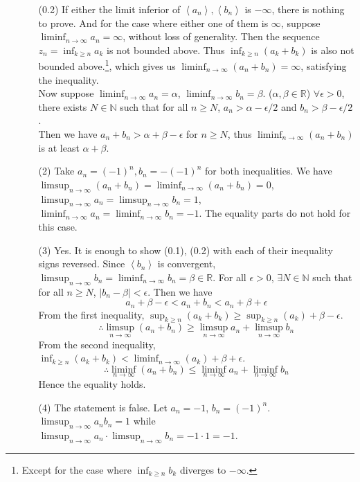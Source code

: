 \documentclass[12pt]{report}
\newcommand{\bb}[1]{\mathbb{#1}}
\renewcommand{\span}[1]{\left\langle #1 \right\rangle}
\newcommand{\abs}[1]{\left|#1\right|}
\newcommand{\ds}{\displaystyle}
\begin{document}
\begin{enumerate}
\begin{enumerate}
	(0.2) If either the limit inferior of $\span{a_n}, \span{b_n}$ is $-\infty$, there is nothing to prove. And for the case where either one of them is $\infty$, suppose $\ds\liminf_{n\rightarrow \infty}a_n=\infty$, without loss of generality. Then the sequence $z_n=\inf_{k\geq n}a_k$ is not bounded above. Thus $\inf_{k\geq n}(a_k+b_k)$ is also not bounded above.\footnote{Except for the case where $\inf_{k\geq n}b_k$ diverges to $-\infty$.}, which gives us $\ds \liminf_{n\rightarrow \infty}(a_n+b_n) = \infty$, satisfying the inequality.\\
	Now suppose $\ds\liminf_{n\rightarrow \infty}a_n = \alpha$, $\ds \liminf_{n\rightarrow \infty} b_n = \beta$. ($\alpha, \beta \in \bb{R}$) $\forall \epsilon > 0$, there exists $N\in \bb{N}$ such that for all $n\geq N$, $a_n > \alpha - \epsilon/2$ and $b_n > \beta - \epsilon /2$. \\Then we have $a_n+b_n > \alpha + \beta - \epsilon$ for $n\geq N$, thus $\ds\liminf_{n\rightarrow \infty}(a_n+b_n)$ is at least $\alpha+\beta$.
	\item[(2)] Take $a_n = (-1)^n, b_n = -(-1)^n$ for both inequalities. We have $\ds\limsup_{n\rightarrow \infty}(a_n+b_n) = \liminf_{n\rightarrow \infty}(a_n+b_n)= 0$, $\ds \limsup_{n\rightarrow \infty}a_n = \limsup_{n\rightarrow \infty}b_n = 1$, $\ds \liminf_{n\rightarrow \infty}a_n = \liminf_{n\rightarrow \infty}b_n=-1$. The equality parts do not hold for this case.
	\item[(3)] Yes. It is enough to show (0.1), (0.2) with each of their inequality signs reversed. Since $\span{b_n}$ is convergent, $\limsup_{n\rightarrow \infty} b_n = \liminf_{n\rightarrow \infty} b_n = \beta \in \bb{R}$. For all $ \epsilon > 0 $, $\exists N\in\bb{N}$ such that for all $n\geq N$, $\abs{b_n-\beta} < \epsilon$. Then we have $$a_n+\beta-\epsilon < a_n+b_n < a_n+\beta+\epsilon$$From the first inequality, $\sup_{k\geq n}(a_k+b_k) \geq \sup_{k\geq n}(a_k) + \beta-\epsilon$. $$\therefore \limsup_{n\rightarrow \infty}(a_n+b_n)\geq \limsup_{n\rightarrow \infty}a_n + \limsup_{n\rightarrow \infty}b_n$$ 
	From the second inequality, $\inf_{k\geq n}(a_k+b_k) < \liminf_{n\rightarrow \infty}(a_k) + \beta+\epsilon$.
	$$\therefore \liminf_{n\rightarrow \infty}(a_n+b_n)\leq \liminf_{n\rightarrow \infty}a_n + \liminf_{n\rightarrow \infty}b_n$$
	Hence the equality holds.
	\item[(4)] The statement is false. Let $a_n = -1$, $b_n = (-1)^n$. $\ds\limsup_{n\rightarrow \infty}a_nb_n = 1$ while $\ds\limsup_{n\rightarrow \infty}a_n \cdot \limsup_{n\rightarrow \infty}b_n = -1 \cdot 1 = -1$.
\end{enumerate}


\end{enumerate}
\end{document}
